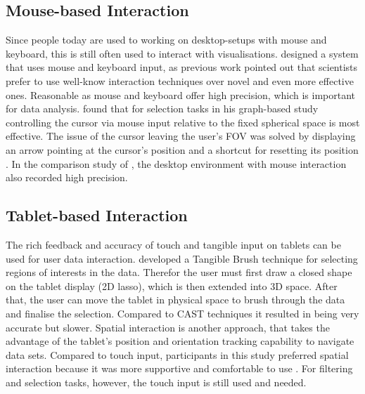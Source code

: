 \subsection{Mouse-based Interaction}
\label{subsection:Desktop-based Interaction}
Since people today are used to working on desktop-setups with mouse and keyboard, this is still often used to interact with visualisations. 
 \cite{Wang2020} designed a system that uses mouse and keyboard input, as previous work pointed out that scientists prefer to use well-know interaction techniques over novel and even more effective ones. Reasonable as mouse and keyboard offer high precision, which is important for data analysis. 
 \newline \cite{Kwon2016} found that for selection tasks in his graph-based study controlling the cursor via mouse input relative to the fixed spherical space is most effective. The issue of the cursor leaving the user's \ac{FOV} was solved by displaying an arrow pointing at the cursor's position and a shortcut for resetting its position \autocite[]{Kwon2016}.
In the comparison study of \cite{Bach2018}, the desktop environment with mouse interaction also recorded high precision.

\subsection{Tablet-based Interaction}
\label{subsection:Tablet-based Interaction}
The rich feedback and accuracy of touch and tangible input on tablets can be used for user data interaction. \cite{Besancon2019} developed a Tangible Brush technique for selecting regions of interests in the data. Therefor the user must first draw a closed shape on the tablet display (2D lasso), which is then extended into 3D space. After that, the user can move the tablet in physical space to brush through the data and finalise the selection. Compared to CAST techniques \autocite{Yu2016} it resulted in being very accurate but slower.\newline
Spatial interaction is another approach, that takes the advantage of the tablet's position and orientation tracking capability to navigate data sets. Compared to touch input, participants in this study preferred spatial interaction because it was more supportive and comfortable to use \autocite{Buschel2017}. For filtering and selection tasks, however, the touch input is still used and needed.

